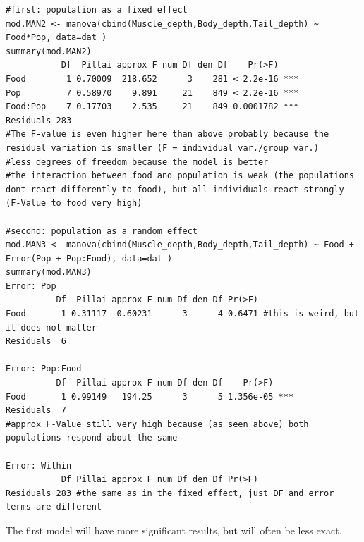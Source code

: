 \documentclass{article}
\begin{document}
\begin{lstlisting}
#first: population as a fixed effect
mod.MAN2 <- manova(cbind(Muscle_depth,Body_depth,Tail_depth) ~ Food*Pop, data=dat )
summary(mod.MAN2)
           Df  Pillai approx F num Df den Df    Pr(>F)    
Food        1 0.70009  218.652      3    281 < 2.2e-16 ***
Pop         7 0.58970    9.891     21    849 < 2.2e-16 ***
Food:Pop    7 0.17703    2.535     21    849 0.0001782 ***
Residuals 283  
#The F-value is even higher here than above probably because the residual variation is smaller (F = individual var./group var.)
#less degrees of freedom because the model is better
#the interaction between food and population is weak (the populations dont react differently to food), but all individuals react strongly (F-Value to food very high)

#second: population as a random effect
mod.MAN3 <- manova(cbind(Muscle_depth,Body_depth,Tail_depth) ~ Food + Error(Pop + Pop:Food), data=dat )
summary(mod.MAN3)
Error: Pop
          Df  Pillai approx F num Df den Df Pr(>F)
Food       1 0.31117  0.60231      3      4 0.6471 #this is weird, but it does not matter
Residuals  6                                      

Error: Pop:Food
          Df  Pillai approx F num Df den Df    Pr(>F)    
Food       1 0.99149   194.25      3      5 1.356e-05 ***
Residuals  7                                             
#approx F-Value still very high because (as seen above) both populations respond about the same

Error: Within
           Df Pillai approx F num Df den Df Pr(>F)
Residuals 283 #the same as in the fixed effect, just DF and error terms are different
\end{lstlisting}

The first model will have more significant results, but will often be less exact.
\end{document}
